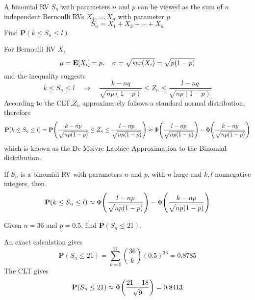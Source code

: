 \documentclass[device=normal, lang=en]{elegantbook}
\numberwithin{equation}{section}
\begin{document}
\begin{example}[Binomial RV]
    A binomial RV $S_n$ with parameters $n$ and $p$ can be viewed as the sum of $n$ independent Bernoulli RVs $X_1, \ldots, X_n$ with parameter $p$
    \begin{equation}
        S_n = X_1 + X_2 + \cdots + X_n
    \end{equation}
    Find $\mathbf{P}(k \leq S_n \leq l)$.
\end{example}
\begin{solution}
    For Bernoulli RV $X_i$
    \begin{equation}
        \mu = \mathbf{E}[X_i] = p, \quad \sigma = \sqrt{\mathrm{var}(X_i)} = \sqrt{p(1-p)}
    \end{equation}
    and the inequality suggests
    \begin{equation}
        k \leq S_n \leq l \quad\Rightarrow\quad \frac{k - nq}{\sqrt{np(1-p)}} \leq Z_n \leq \frac{l - nq}{\sqrt{np(1-p)}}
    \end{equation}
    According to the CLT,$Z_n$ approximately follows a standard normal distribution, therefore
    \begin{equation}
        \mathbf{P}(k \leq S_n \leq l) = \mathbf{P}\qty(\frac{k - np}{\sqrt{np(1-p)}} \leq Z_n \leq \frac{l - np}{\sqrt{np(1-p)}}) \approx \Phi\qty(\frac{l - np}{\sqrt{np(1-p)}}) - \Phi\qty(\frac{k - np}{\sqrt{np(1-p)}})
    \end{equation}
    which is known as the De Moivre-Laplace Approximation to the Binomial distribution.
\end{solution}
\begin{theorem}
    If $S_n$ is a binomial RV with parameters $n$ and $p$, with $n$ large and $k, l$ nonnegative integers, then
    \begin{equation}
        \mathbf{P}(k \leq S_n \leq l) \approx \Phi\qty(\frac{l - np}{\sqrt{np(1-p)}}) - \Phi\qty(\frac{k - np}{\sqrt{np(1-p)}})
    \end{equation}
\end{theorem}
\begin{example}
    Given $n = 36$ and $p = 0.5$, find $\mathbf{P}(S_n \leq 21)$.
\end{example}
\begin{solution}
    An exact calculation gives
    \begin{equation}
        \mathbf{P}(S_n \leq 21) = \sum_{k=0}^{21} \binom{36}{k} (0.5)^{36} = 0.8785
    \end{equation}
    The CLT gives
    \begin{equation}
        \mathbf{P}(S_n \leq 21) \approx \Phi\qty(\frac{21 - 18}{\sqrt{9}}) = 0.8413
    \end{equation}
\end{solution}
\end{document}
